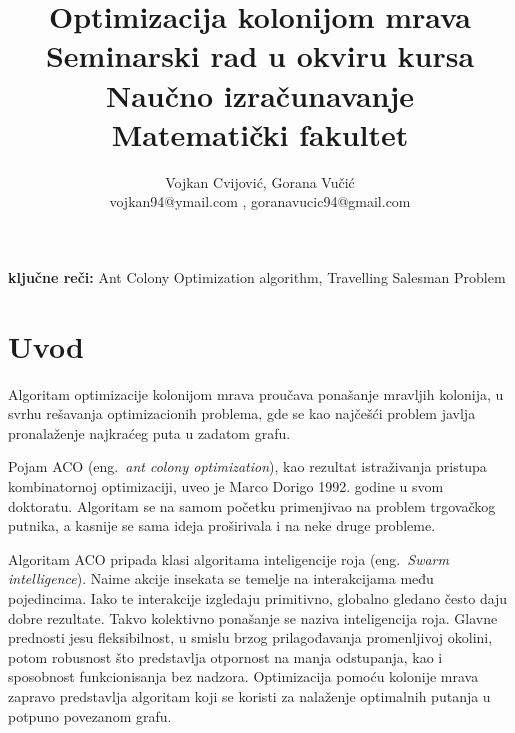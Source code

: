\documentclass[a4paper]{article}
\providecommand{\keywords}[1]{\textbf{ključne reči:} #1}
\begin{document}
\title{Optimizacija kolonijom mrava\\ 
\hfill \break
\small{Seminarski rad u okviru kursa\\Naučno izračunavanje\\ Matematički fakultet}}

\author{Vojkan Cvijović, Gorana Vučić\\ vojkan94@ymail.com , goranavucic94@gmail.com}


\maketitle


\hfill \break

\keywords{
	Ant Colony Optimization algorithm, Travelling Salesman Problem
}

\tableofcontents

\newpage

\section{Uvod}
\label{sec:uvod}

Algoritam optimizacije kolonijom mrava proučava ponašanje mravljih kolonija, u svrhu rešavanja optimizacionih
problema, gde se kao najčešći problem javlja pronalaženje najkraćeg puta u zadatom grafu.

\vspace{3mm}

Pojam ACO (eng.~{\em ant colony optimization}), kao rezultat istraživanja pristupa kombinatornoj optimizaciji, uveo je Marco Dorigo 1992. godine u svom doktoratu. Algoritam se na samom početku primenjivao na problem trgovačkog putnika, a kasnije se sama ideja proširivala i na neke druge probleme.

\vspace{3mm}

Algoritam ACO pripada klasi algoritama inteligencije roja (eng.~{\em Swarm intelligence}). Naime akcije insekata se temelje na interakcijama među pojedincima. Iako te interakcije izgledaju primitivno, globalno gledano često daju dobre rezultate. Takvo kolektivno ponašanje se naziva inteligencija roja. Glavne prednosti jesu fleksibilnost, u smislu brzog prilagođavanja promenljivoj okolini, potom robusnost što predstavlja otpornost na manja odstupanja, kao i sposobnost funkcionisanja bez nadzora. Optimizacija pomoću kolonije mrava zapravo predstavlja algoritam koji se koristi za nalaženje optimalnih putanja u potpuno povezanom grafu.
\end{document}
